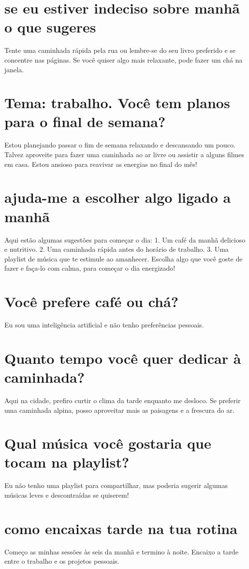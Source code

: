 \documentclass[11pt,a4paper]{article}
\begin{document}
\section{se eu estiver indeciso sobre manhã o que sugeres}
Tente uma caminhada rápida pela rua ou lembre-se do seu livro preferido e se concentre nas páginas. Se você quiser algo mais relaxante, pode fazer um chá na janela.

\section{Tema: trabalho. Você tem planos para o final de semana?}
Estou planejando passar o fim de semana relaxando e descansando um pouco. Talvez aproveite para fazer uma caminhada ao ar livre ou assistir a alguns filmes em casa. Estou ansioso para reavivar as energias no final do mês!

\section{ajuda-me a escolher algo ligado a manhã}
Aqui estão algumas sugestões para começar o dia: 1. Um café da manhã delicioso e nutritivo. 2. Uma caminhada rápida antes do horário de trabalho. 3. Uma playlist de música que te estimule ao amanhecer. Escolha algo que você goste de fazer e faça-lo com calma, para começar o dia energizado!

\section{Você prefere café ou chá?}
Eu sou uma inteligência artificial e não tenho preferências pessoais.

\section{Quanto tempo você quer dedicar à caminhada?}
Aqui na cidade, prefiro curtir o clima da tarde enquanto me desloco. Se preferir uma caminhada alpina, posso aproveitar mais as paisagens e a frescura do ar.

\section{Qual música você gostaria que tocam na playlist?}
Eu não tenho uma playlist para compartilhar, mas poderia sugerir algumas músicas leves e descontraídas se quiserem!

\section{como encaixas tarde na tua rotina}
Começo as minhas sessões às seis da manhã e termino à noite. Encaixo a tarde entre o trabalho e os projetos pessoais.
\end{document}
